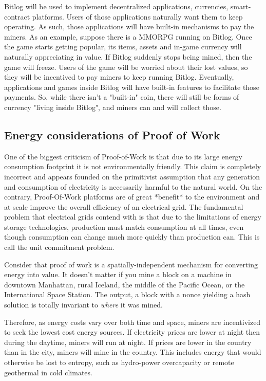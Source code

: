 \documentclass{article}
\theoremstyle{definition}
\theoremstyle{theorem}
\begin{document}
Bitlog will be used to implement decentralized applications, currencies,
smart-contract platforms. Users of those applications naturally want them to
keep operating. As such, those applications will have built-in mechanisms to pay
the miners. As an example, suppose there is a MMORPG running on Bitlog. Once the
game starts getting popular, its items, assets and in-game currency will
naturally appreciating in value. If Bitlog suddenly stops being mined, then the
game will freeze. Users of the game will be worried about their lost values, so
they will be incentived to pay miners to keep running Bitlog. Eventually,
applications and games inside Bitlog will have built-in features to facilitate
those payments. So, while there isn't a "built-in" coin, there will still be
forms of currency "living inside Bitlog", and miners can and will collect those.

\subsection{Energy considerations of Proof of Work}

One of the biggest criticism of Proof-of-Work is that due to its large energy
consumption footprint it is not environmentally friendly. This claim is
completely incorrect and appears founded on the primitivist assumption that any
generation and consumption of electricity is necessarily harmful to the natural
world. On the contrary, Proof-Of-Work platforms are of great *benefit* to the
environment and at scale improve the overall efficiency of an electrical grid.
The fundamental problem that electrical grids contend with is that due to the
limitations of energy storage technologies, production must match consumption
at all times, even though consumption can change much more quickly than
production can. This is call the unit commitment problem.

Consider that proof of work is a spatially-independent mechanism for converting
energy into value. It doesn't matter if you mine a block on a machine in
downtown Manhattan, rural Iceland, the middle of the Pacific Ocean, or the
International Space Station. The output, a block with a nonce yielding a hash
solution is totally invariant to \emph{where} it was mined.

Therefore, as energy costs vary over both time and space, miners are
incentivized to seek the lowest cost energy sources. If electricity prices are
lower at night then during the daytime, miners will run at night. If prices are
lower in the country than in the city, miners will mine in the country. This
includes energy that would otherwise be lost to entropy, such as hydro-power
overcapacity or remote geothermal in cold climates.
\end{document}
